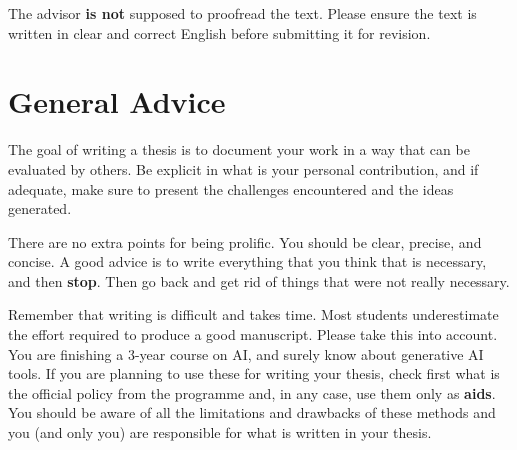 The advisor \textbf{is not} supposed to proofread the text. Please ensure the text is written in clear and correct English before submitting it for revision.

\section{General Advice}

The goal of writing a thesis is to document your work in a way that can be evaluated by others. Be explicit in what is your personal contribution, and if adequate, make sure to present the challenges encountered and the ideas generated.

There are no extra points for being prolific. You should be clear, precise, and concise. A good advice is to write everything that you think that is necessary, and then \textbf{stop}. Then go back and get rid of things that were not really necessary.

Remember that writing is difficult and takes time. Most students underestimate the effort required to produce a good manuscript. Please take this into account. You are finishing a 3-year course on AI, and surely know about generative AI tools. If you are planning to use these for writing your thesis, check first what is the official policy from the programme and, in any case, use them only as \textbf{aids}. You should be aware of all the limitations and drawbacks of these methods and you (and only you) are responsible for what is written in your thesis.